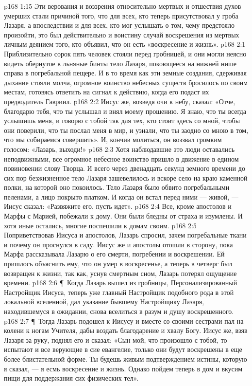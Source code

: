 \vs p168 1:15 Эти верования и воззрения относительно мертвых и отшествия духов умерших стали причиной того, что для всех, кто теперь присутствовал у гроба Лазаря, а впоследствии и для всех, кто мог услышать о том, чему предстояло произойти, это был действительно и воистину случай воскрешения из мертвых личным деянием того, кто объявил, что он есть «воскресение и жизнь».
\vs p168 2:1 Приблизительно сорок пять человек стояли перед гробницей, и они могли неясно видеть обернутое в льняные бинты тело Лазаря, покоющееся на нижней нише справа в погребальной пещере. И в то время как эти земные создания, сдерживая дыхание стояли молча, огромное воинство небесных существ бросилось по своим местам, готовясь ответить на сигнал к действию, когда его подаст их предводитель Гавриил.
\vs p168 2:2 Иисус же, возведя очи к небу, сказал: «Отче, благодарю тебя, что ты услышал и внял моему прошению. Я знаю, что ты всегда услышишь меня, и говорю с тобой так для тех, кто стоит здесь со мной, чтобы они поверили, что ты послал меня в мир, и узнали, что ты заодно со мною в том, что мы собираемся совершить». И, кончив молиться, он воззвал громким голосом: «Лазарь, выходи!»
\vs p168 2:3 Хотя наблюдавшие это люди оставались неподвижными, все огромное небесное воинство пришло в движение в едином повиновении слову Творца. И всего через двенадцать секунд земного времени до сих пор безжизненное тело Лазаря зашевелилось и вскоре село на краю каменной полки, на которой оно покоилось. Тело Лазаря было обвито погребальными пеленами, а лицо покрыто платком. И когда он встал перед ними --- живой, --- Иисус сказал: «Развяжите его, пусть идет».
\vs p168 2:4 Все, кроме апостолов и Марфы с Марией, побежали к дому. Они были бледны от страха и изумлены. И хотя иные остались, многие поспешили к домам своим.
\vs p168 2:5 Поприветствовав Иисуса и апостолов, Лазарь спросил, зачем погребальные ткани и почему он проснулся в саду. Иисус же и апостолы отошли в сторону, пока Марфа рассказывала Лазарю о его смерти, погребении и воскрешении. Ей пришлось объяснить ему, что он умер в воскресенье, а теперь в четверг был возвращен к жизни, так как, уснув смертным сном, Лазарь потерял ощущение времени.
\vs p168 2:6 \P\ Когда Лазарь вышел из гробницы, Персонализированный Настройщик Иисуса, теперь уже главный Настройщик подобного рода в этой локальной вселенной, дал указание бывшему Настройщику Лазаря, находившемуся в ожидании, снова вселиться в разум и душу воскрешенного.
\vs p168 2:7 \P\ Тогда Лазарь подошел к Иисусу и вместе со своими сестрами пал на колени к ногам Учителя, дабы воздать благодарение и хвалу Богу. Иисус же, взяв Лазаря за руку, поднял его и сказал: «Сын мой, что произошло с тобой, то испытают и все верующие в сие евангелие, только они будут воскрешены в еще более блистательной форме. Ты будешь живым подтверждением истины, которую я сказал, --- я есмь воскресение и жизнь. Однако пойдем теперь в дом и вкусим пищи для поддержания сих физических тел».
